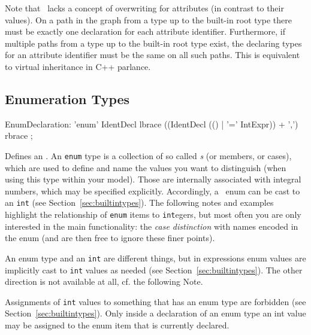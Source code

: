 Note that \GrG\ lacks a concept of overwriting for attributes (in contrast to their values).
On a path in the  graph from a type up to the built-in root type there must be exactly one declaration for each attribute identifier. Furthermore, if multiple paths from a type up to the built-in root type exist, the declaring types for an attribute identifier must be the same on all such paths.
This is equivalent to virtual inheritance in C++ parlance.

\pagebreak

\subsection{Enumeration Types}
\label{sct:enumtypes}
\begin{rail}
  EnumDeclaration: 'enum' IdentDecl lbrace ((IdentDecl (() | '=' IntExpr)) + ',') rbrace ;
\end{rail}
Defines an .
An \texttt{enum} type is a collection of so called \emph{s} (or members, or cases), which are used to define and name the values you want to distinguish (when using this type within your model). 
Those are internally associated with integral numbers, which may be specified explicitly.
Accordingly, a \GrG\ enum can be cast to an \texttt{int} (see Section~\ref{sec:builtintypes}).
The following notes and examples highlight the relationship of \texttt{enum} items to \texttt{int}egers, but most often you are only interested in the main functionality: the \emph{case distinction} with names encoded in the enum (and are then free to ignore these finer points). 

\begin{note}
	An enum type and an {\tt int} are different things, but in expressions enum values are implicitly cast to {\tt int} values as needed (see Section~\ref{sec:builtintypes}). The other direction is not available at all, cf. the following Note.
\end{note}

\begin{warning}
	Assignments of {\tt int} values to something that has an enum type are forbidden (see Section~\ref{sec:builtintypes}).
	Only inside a declaration of an enum type an int value may be assigned to the enum item that is currently declared.
\end{warning}

